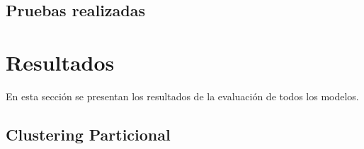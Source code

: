 \documentclass{article}
\begin{document}



\subsection{Pruebas realizadas}

\section{Resultados}

\noindent En esta sección se presentan los resultados de la evaluación de todos los modelos.

\subsection{Clustering Particional}

\end{document}
